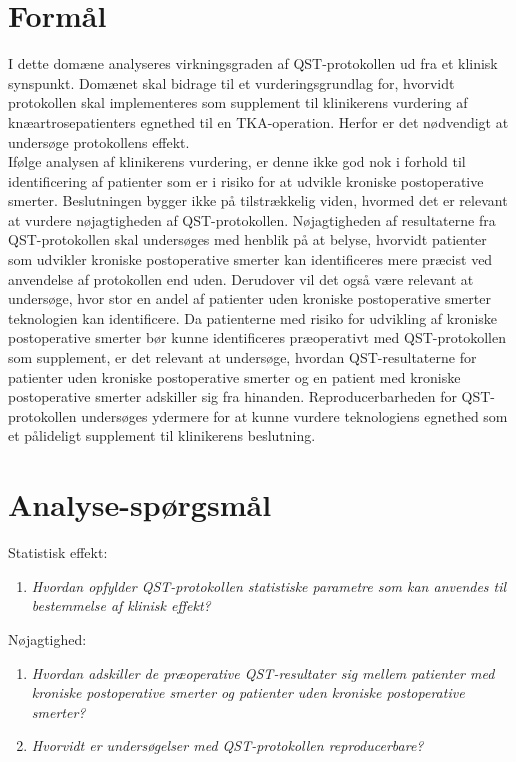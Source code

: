 \section{Formål}
I dette domæne analyseres virkningsgraden af QST-protokollen ud fra et klinisk synspunkt. Domænet skal bidrage til et vurderingsgrundlag for, hvorvidt protokollen skal implementeres som supplement til klinikerens vurdering af knæartrosepatienters egnethed til en TKA-operation. Herfor er det nødvendigt at undersøge protokollens effekt. \\
Ifølge analysen af klinikerens vurdering, er denne ikke god nok i forhold til identificering af patienter som er i risiko for at udvikle kroniske postoperative smerter. Beslutningen bygger ikke på tilstrækkelig viden, hvormed det er relevant at vurdere nøjagtigheden af QST-protokollen. Nøjagtigheden af resultaterne fra QST-protokollen skal undersøges med henblik på at belyse, hvorvidt patienter som udvikler kroniske postoperative smerter kan identificeres mere præcist ved anvendelse af protokollen end uden. Derudover vil det også være relevant at undersøge, hvor stor en andel af patienter uden kroniske postoperative smerter teknologien kan identificere. Da patienterne med risiko for udvikling af kroniske postoperative smerter bør kunne identificeres præoperativt med QST-protokollen som supplement, er det relevant at undersøge, hvordan QST-resultaterne for patienter uden kroniske postoperative smerter og en patient med kroniske postoperative smerter adskiller sig fra hinanden. Reproducerbarheden for QST-protokollen undersøges ydermere for at kunne vurdere teknologiens egnethed som et pålideligt supplement til klinikerens beslutning.

\section{Analyse-spørgsmål}
Statistisk effekt:
\begin{enumerate}
	\item \textit{Hvordan opfylder QST-protokollen statistiske parametre som kan anvendes til bestemmelse af klinisk effekt?} %
\end{enumerate}
Nøjagtighed:
\begin{enumerate}[resume]
	\item \textit{Hvordan adskiller de præoperative QST-resultater sig mellem patienter med kroniske postoperative smerter og patienter uden kroniske postoperative smerter?} %
	\item \textit{Hvorvidt er undersøgelser med QST-protokollen reproducerbare?} 
\end{enumerate}

